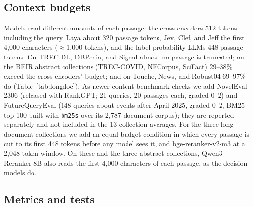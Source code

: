 \subsection{Context budgets}

Models read different amounts of each passage: the cross-encoders 512 tokens including the query, Laya about 320 passage tokens, Jev, Clef, and Jeff the first 4{,}000 characters ($\approx$1{,}000 tokens), and the label-probability LLMs 448 passage tokens.
On TREC DL, DBPedia, and Signal almost no passage is truncated; on the BEIR abstract collections (TREC-COVID, NFCorpus, SciFact) 29--38\% exceed the cross-encoders' budget; and on Touche, News, and Robust04 69--97\% do (Table~\ref{tab:longdoc}).
As newer-content benchmark checks we add NovelEval-2306 (released with RankGPT\cite{sun2023rankgpt}; 21 queries, 20 passages each, graded 0--2) and FutureQueryEval\cite{abdallah2025futurequery} (148 queries about events after April 2025, graded 0--2, BM25 top-100 built with \texttt{bm25s}\cite{lu2024bm25s} over its 2{,}787-document corpus); they are reported separately and not included in the 13-collection averages.
For the three long-document collections we add an equal-budget condition in which every passage is cut to its first 448 tokens before any model sees it, and bge-reranker-v2-m3 at a 2{,}048-token window. On these and the three abstract collections, Qwen3-Reranker-8B also reads the first 4{,}000 characters of each passage, as the decision models do.

\subsection{Metrics and tests}

